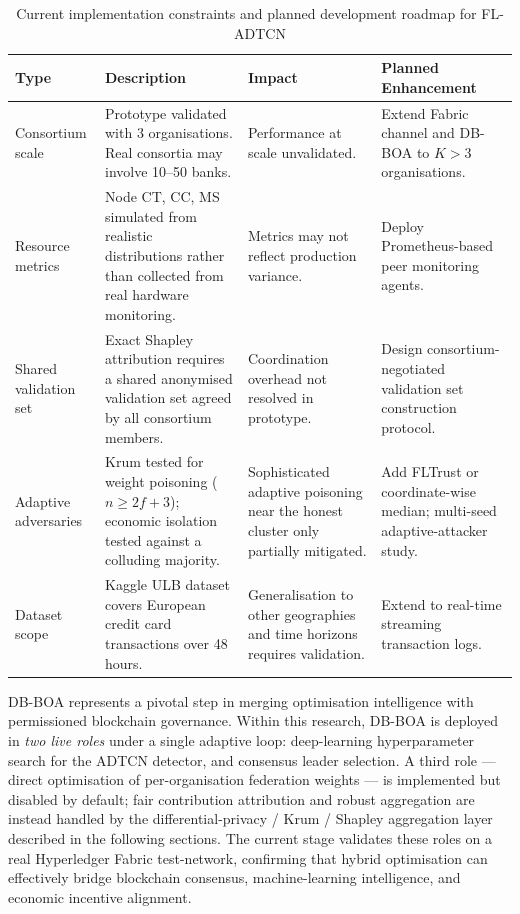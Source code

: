 \begin{table}[H]
\centering
\caption{Current implementation constraints and planned development roadmap for FL-ADTCN}
\label{tab:constraints_roadmap}
\begin{tabular}{|p{2.3cm}|p{5.5cm}|p{2.9cm}|p{2.4cm}|}
\hline
\textbf{Type} & \textbf{Description} & \textbf{Impact} & \textbf{Planned Enhancement} \\ \hline
Consortium scale & Prototype validated with 3 organisations. Real consortia may involve 10--50 banks. & Performance at scale unvalidated. & Extend Fabric channel and DB-BOA to $K > 3$ organisations. \\ \hline
Resource metrics & Node CT, CC, MS simulated from realistic distributions rather than collected from real hardware monitoring. & Metrics may not reflect production variance. & Deploy Prometheus-based peer monitoring agents. \\ \hline
Shared validation set & Exact Shapley attribution requires a shared anonymised validation set agreed by all consortium members. & Coordination overhead not resolved in prototype. & Design consortium-negotiated validation set construction protocol. \\ \hline
Adaptive adversaries & Krum tested for weight poisoning ($n\ge 2f+3$); economic isolation tested against a colluding majority. & Sophisticated adaptive poisoning near the honest cluster only partially mitigated. & Add FLTrust or coordinate-wise median; multi-seed adaptive-attacker study. \\ \hline
Dataset scope & Kaggle ULB dataset covers European credit card transactions over 48 hours. & Generalisation to other geographies and time horizons requires validation. & Extend to real-time streaming transaction logs. \\ \hline
\end{tabular}
\end{table}

DB-BOA represents a pivotal step in merging optimisation intelligence with permissioned blockchain governance. Within this research, DB-BOA is deployed in \emph{two live roles} under a single adaptive loop: deep-learning hyperparameter search for the ADTCN detector, and consensus leader selection. A third role --- direct optimisation of per-organisation federation weights --- is implemented but disabled by default; fair contribution attribution and robust aggregation are instead handled by the differential-privacy / Krum / Shapley aggregation layer described in the following sections. The current stage validates these roles on a real Hyperledger Fabric test-network, confirming that hybrid optimisation can effectively bridge blockchain consensus, machine-learning intelligence, and economic incentive alignment.

